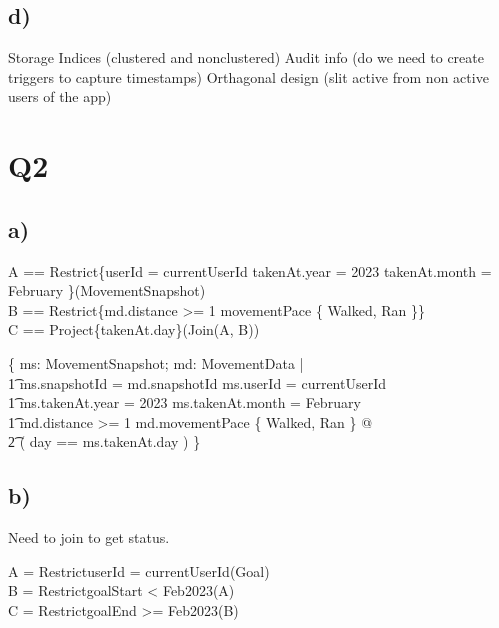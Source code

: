 \documentclass{article}
\begin{document}
\subsection*{\small d)}

Storage
\newline
Indices (clustered and nonclustered)
\newline
Audit info (do we need to create triggers to capture timestamps)
\newline
Orthagonal design (slit active from non active users of the app)

\pagebreak 
\section*{Q2}

\subsection*{\small a)}

\begin{zed}
    A == Restrict\small{\{userId = currentUserId \land takenAt.year = 2023 \land takenAt.month = February \}}(MovementSnapshot) \\
    B == Restrict\small{\{md.distance >= 1 \land movementPace \in \{ Walked, Ran \}\}} \\
    C == Project\small{\{takenAt.day\}}(Join(A, B)) \\
\end{zed}

\begin{zed}
\{ ms: MovementSnapshot; md: MovementData | \\
    \t1 ms.snapshotId = md.snapshotId \land ms.userId = currentUserId \\
    \t1 ms.takenAt.year = 2023 \land ms.takenAt.month = February \\
    \t1 md.distance >= 1 \land md.movementPace \in \{ Walked, Ran \} @ \\
        \t2 ( day == ms.takenAt.day ) \}
\end{zed}

\subsection*{\small b)}

Need to join to get status.

\begin{zed}
A = Restrict\small{userId = currentUserId}(Goal) \\
B = Restrict\small{goalStart < Feb2023}(A) \\
C = Restrict\small{goalEnd >= Feb2023}(B)
\end{zed}
\end{document}
